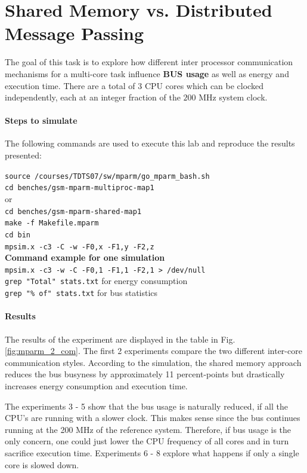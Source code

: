 \documentclass[10pt,bibliography=totocnumbered,listof=totocnumbered, footsepline, headsepline]{scrreprt}
\begin{document}
\section{Shared Memory vs. Distributed Message Passing}

The goal of this task is to explore how different inter processor communication mechanisms for a multi-core task influence \textbf{BUS usage} as well as energy and execution time. There are a total of 3 CPU cores which can be clocked independently, each at an integer fraction of the $200$ MHz system clock.

\paragraph*{Steps to simulate} 
The following commands are used to execute this lab and reproduce the results presented:

\texttt{source /courses/TDTS07/sw/mparm/go\_mparm\_bash.sh} \\
\texttt{cd benches/gsm-mparm-multiproc-map1} \\
or \\
\texttt{cd benches/gsm-mparm-shared-map1} \\
\texttt{make -f Makefile.mparm} \\
\texttt{cd bin} \\
\texttt{mpsim.x -c3 -C -w -F0,x -F1,y -F2,z} \\

\textbf{Command example for one simulation} \\
\texttt{mpsim.x -c3 -w -C -F0,1 -F1,1 -F2,1 > /dev/null} \\
\texttt{grep "Total" stats.txt} for energy consumption \\
\texttt{grep "\% of" stats.txt} for bus statistics \\

\paragraph*{Results}
The results of the experiment are displayed in the table in Fig. \ref{fig:mparm_2_com}.
The first 2 experiments compare the two different inter-core communication styles.
According to the simulation, the shared memory approach reduces the bus busyness by approximately 11 percent-points but drastically increases energy consumption and execution time.

The experiments 3 - 5 show that the bus usage is naturally reduced, if all the CPU's are running with a slower clock. This makes sense since the bus continues running at the 200 MHz of the reference system.
Therefore, if bus usage is the only concern, one could just lower the CPU frequency of all cores and in turn sacrifice execution time.
Experiments 6 - 8 explore what happens if only a single core is slowed down.
\end{document}

